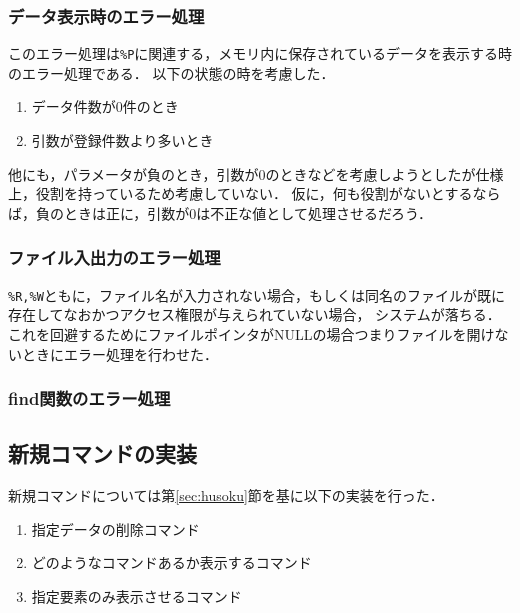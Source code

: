 \documentclass[a4j,11pt]{jarticle}
\begin{document}
\subsubsection{データ表示時のエラー処理}
このエラー処理は\verb|%P|に関連する，メモリ内に保存されているデータを表示する時のエラー処理である．
以下の状態の時を考慮した．\begin{enumerate}
\setlength{\parskip}{2pt} \setlength{\itemsep}{2pt}
    \item データ件数が0件のとき
    \item 引数が登録件数より多いとき
\end{enumerate}
他にも，パラメータが負のとき，引数が$0$のときなどを考慮しようとしたが仕様上，役割を持っているため考慮していない．
仮に，何も役割がないとするならば，負のときは正に，引数が0は不正な値として処理させるだろう．

\subsubsection{ファイル入出力のエラー処理}
\verb|%R,%W|ともに，ファイル名が入力されない場合，もしくは同名のファイルが既に存在してなおかつアクセス権限が与えられていない場合，
システムが落ちる．これを回避するためにファイルポインタがNULLの場合つまりファイルを開けないときにエラー処理を行わせた．
\subsubsection{find関数のエラー処理}
\subsection{新規コマンドの実装}
新規コマンドについては第\ref{sec:husoku}節を基に以下の実装を行った．
\begin{enumerate}
\setlength{\parskip}{2pt} \setlength{\itemsep}{2pt}
    \item 指定データの削除コマンド
    \item どのようなコマンドあるか表示するコマンド
    \item 指定要素のみ表示させるコマンド
\end{enumerate}
\end{document}
